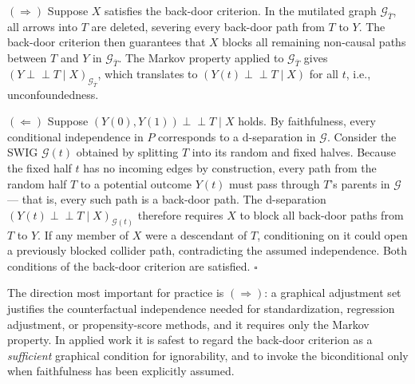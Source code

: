 \documentclass[
  a4paper,
]{book}
\newcommand{\indep}{\perp\!\!\!\perp}
\newcommand{\Gcal}{\mathcal{G}}
\begin{document}
\begin{tcolorbox}[enhanced jigsaw, arc=.35mm, bottomrule=.15mm, bottomtitle=1mm, breakable, colback=white, colbacktitle=quarto-callout-note-color!10!white, colframe=quarto-callout-note-color-frame, coltitle=black, left=2mm, leftrule=.75mm, opacityback=0, opacitybacktitle=0.6, rightrule=.15mm, title={Proof Sketch}, titlerule=0mm, toprule=.15mm, toptitle=1mm]

\((\Rightarrow)\) Suppose \(X\) satisfies the back-door criterion. In
the mutilated graph \(\Gcal_{\overline{T}}\), all arrows into \(T\) are
deleted, severing every back-door path from \(T\) to \(Y\). The
back-door criterion then guarantees that \(X\) blocks all remaining
non-causal paths between \(T\) and \(Y\) in \(\Gcal_{\overline{T}}\).
The Markov property applied to \(\Gcal_{\overline{T}}\) gives
\((Y \indep T \mid X)_{\Gcal_{\overline{T}}}\), which translates to
\((Y(t) \indep T \mid X)\) for all \(t\), i.e., unconfoundedness.

\((\Leftarrow)\) Suppose \((Y(0), Y(1)) \indep T \mid X\) holds. By
faithfulness, every conditional independence in \(P\) corresponds to a
d-separation in \(\Gcal\). Consider the SWIG \(\Gcal(t)\) obtained by
splitting \(T\) into its random and fixed halves. Because the fixed half
\(t\) has no incoming edges by construction, every path from the random
half \(T\) to a potential outcome \(Y(t)\) must pass through \(T\)'s
parents in \(\Gcal\) --- that is, every such path is a back-door path.
The d-separation \((Y(t) \indep T \mid X)_{\Gcal(t)}\) therefore
requires \(X\) to block all back-door paths from \(T\) to \(Y\). If any
member of \(X\) were a descendant of \(T\), conditioning on it could
open a previously blocked collider path, contradicting the assumed
independence. Both conditions of the back-door criterion are satisfied.
\(\square\)

\end{tcolorbox}

\begin{tcolorbox}[enhanced jigsaw, arc=.35mm, bottomrule=.15mm, bottomtitle=1mm, breakable, colback=white, colbacktitle=quarto-callout-note-color!10!white, colframe=quarto-callout-note-color-frame, coltitle=black, left=2mm, leftrule=.75mm, opacityback=0, opacitybacktitle=0.6, rightrule=.15mm, title={Remark}, titlerule=0mm, toprule=.15mm, toptitle=1mm]

The direction most important for practice is \((\Rightarrow)\): a
graphical adjustment set justifies the counterfactual independence
needed for standardization, regression adjustment, or propensity-score
methods, and it requires only the Markov property. In applied work it is
safest to regard the back-door criterion as a \emph{sufficient}
graphical condition for ignorability, and to invoke the biconditional
only when faithfulness has been explicitly assumed.

\end{tcolorbox}
\end{document}
